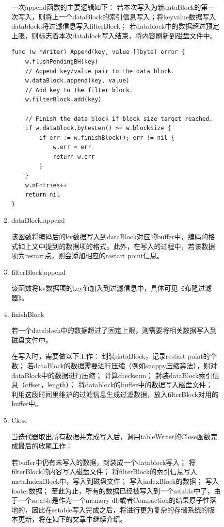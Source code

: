 \begin{enumerate}
\begin{enumerate}
\begin{enumerate}
				一次append函数的主要逻辑如下：
若本次写入为新dataBlock的第一次写入，则将上一个dataBlock的索引信息写入；将keyvalue数据写入datablock;将过滤信息写入filterBlock；
若datablock中的数据超过预定上限，则标志着本次datablock写入结束，将内容刷新到磁盘文件中。

\begin{lstlisting}[caption=Append , label=code_radds_storage_Append]
func (w *Writer) Append(key, value []byte) error {
	w.flushPendingBH(key)
	// Append key/value pair to the data block.
	w.dataBlock.append(key, value)
	// Add key to the filter block.
	w.filterBlock.add(key)
	
	// Finish the data block if block size target reached.
	if w.dataBlock.bytesLen() >= w.blockSize {
		if err := w.finishBlock(); err != nil {
			w.err = err
			return w.err
		}
	}
	w.nEntries++
	return nil
}
\end{lstlisting}


\item dataBlock.append

该函数将编码后的kv数据写入到dataBlock对应的buffer中，编码的格式如上文中提到的数据项的格式。此外，在写入的过程中，若该数据项为restart点，则会添加相应的restart point信息。

\item filterBlock.append

该函数将kv数据项的key值加入到过滤信息中，具体可见《布隆过滤器》。

\item finishBlock

若一个datablock中的数据超过了固定上限，则需要将相关数据写入到磁盘文件中。

在写入时，需要做以下工作：
封装dataBlock，记录restart point的个数；
若dataBlock的数据需要进行压缩（例如snappy压缩算法），则对dataBlock中的数据进行压缩；
计算checksum；
封装dataBlock索引信息（offset，length）；
将datablock的buffer中的数据写入磁盘文件；
利用这段时间里维护的过滤信息生成过滤数据，放入filterBlock对用的buffer中。

\item Close

当迭代器取出所有数据并完成写入后，调用tableWriter的Close函数完成最后的收尾工作：

若buffer中仍有未写入的数据，封装成一个datablock写入；
将filterBlock的内容写入磁盘文件；
将filterBlock的索引信息写入metaIndexBlock中，写入到磁盘文件；
写入indexBlock的数据；
写入footer数据；
至此为止，所有的数据已经被写入到一个sstable中了，由于一个sstable是作为一个memory db或者Compaction的结果原子性落地的，因此在sstable写入完成之后，将进行更为复杂的存储系统的版本更新，将在如下的文章中继续介绍。
			\end{enumerate}



\end{enumerate}
\end{enumerate}
